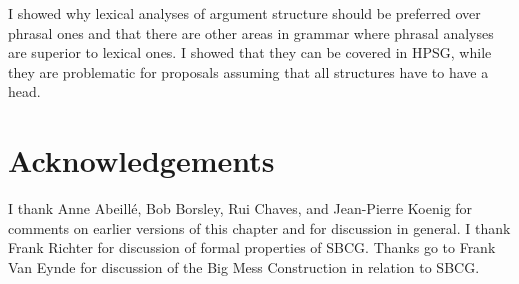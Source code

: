 \documentclass[output=paper
	        ,collection
	        ,collectionchapter
 	        ,biblatex
                ,babelshorthands
                ,newtxmath
                ,draftmode
                ,colorlinks, citecolor=brown
]{langscibook}
\begin{document}
I showed why lexical analyses of argument structure should be
preferred over phrasal ones and that there are other areas in grammar where phrasal analyses are
superior to lexical ones. I showed that they can be covered in HPSG, while they are problematic for
proposals assuming that all structures have to have a head. 





\section*{Acknowledgements}

I thank Anne Abeillé, Bob Borsley, Rui Chaves, and Jean-Pierre Koenig for comments on earlier
versions of this chapter and for discussion in general. I thank Frank Richter for discussion of
formal properties of SBCG. Thanks go to Frank Van Eynde for discussion of the Big Mess Construction
in relation to SBCG.


{\sloppy
\printbibliography[heading=subbibliography,notkeyword=this] 
}
\end{document}
